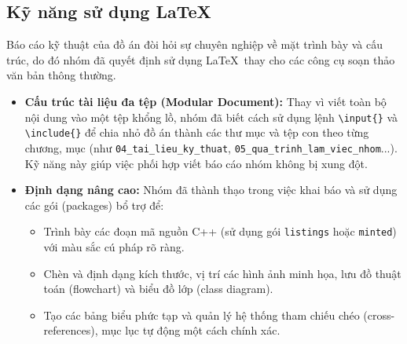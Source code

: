 \subsection{Kỹ năng sử dụng \LaTeX}
Báo cáo kỹ thuật của đồ án đòi hỏi sự chuyên nghiệp về mặt trình bày và cấu trúc, do đó nhóm đã quyết định sử dụng \LaTeX\ thay cho các công cụ soạn thảo văn bản thông thường.
\begin{itemize}
    \item \textbf{Cấu trúc tài liệu đa tệp (Modular Document):} Thay vì viết toàn bộ nội dung vào một tệp khổng lồ, nhóm đã biết cách sử dụng lệnh \texttt{\textbackslash input\{\}} và \texttt{\textbackslash include\{\}} để chia nhỏ đồ án thành các thư mục và tệp con theo từng chương, mục (như \texttt{04\_tai\_lieu\_ky\_thuat}, \texttt{05\_qua\_trinh\_lam\_viec\_nhom}...). Kỹ năng này giúp việc phối hợp viết báo cáo nhóm không bị xung đột.
    \item \textbf{Định dạng nâng cao:} Nhóm đã thành thạo trong việc khai báo và sử dụng các gói (packages) bổ trợ để:
    \begin{itemize}
        \item Trình bày các đoạn mã nguồn C++ (sử dụng gói \texttt{listings} hoặc \texttt{minted}) với màu sắc cú pháp rõ ràng.
        \item Chèn và định dạng kích thước, vị trí các hình ảnh minh họa, lưu đồ thuật toán (flowchart) và biểu đồ lớp (class diagram).
        \item Tạo các bảng biểu phức tạp và quản lý hệ thống tham chiếu chéo (cross-references), mục lục tự động một cách chính xác.
    \end{itemize}
\end{itemize}

